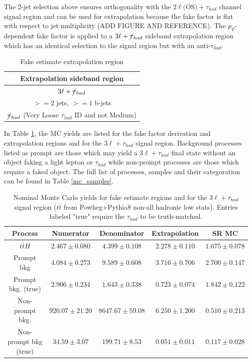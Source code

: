 \documentclass[11pt]{article}
\begin{document}
	The 2-jet selection above ensures orthogonality with the $2\ell \text{(OS)}+\tau_{had}$ channel signal region and can be used for extrapolation because the fake factor is flat with respect to jet multiplicity (ADD FIGURE AND REFERENCE). The $p_T$-dependent fake factor is applied to a $3\ell+\cancel{\tau}_{had}$ sideband extrapolation region which has an identical selection to the signal region but with an anti-$\tau_{had}$. 

	\begin{table}[htp]
		\caption{Fake estimate extrapolation region} 
		\begin{center}
			\begin{tabular}{|c|}
			\hline
			Extrapolation sideband region	\\
			\hline
			$3\ell+\cancel{\tau}_{had}$ 	\\
			$>=2$ jets, $>=1$ b-jets	\\
			$\cancel{\tau}_{had}$ (Very Loose $\tau_{had}$ ID and not Medium) \\
			\hline
			\end{tabular}
		\end{center}
	\end{table}%

	In Table \ref{yields}, the MC yields are listed for the fake factor derivation and extrapolation regions and for the $3\ell+\tau_{had}$ signal region. Background processes listed as prompt are those which may yield a $3\ell+\tau_{had}$ final state without an object faking a light lepton or $\tau_{had}$ while non-prompt processes are those which require a faked object. The full list of processes, samples and their categoration can be found in Table \ref{mc_samples}. 

	\begin{table}[htp]
		\caption{Nominal Monte Carlo yields for fake estimate regions and for the $3\ell+\tau_{had}$ signal region ($t\bar{t}$ from Powheg+Pythia8 non-all hadronic low stats). Entries labeled "true" require the $\tau_{had}$ to be truth-matched.  }
		\begin{center}
			\begin{tabular}{|c|c|c|c|c|}
			\hline
			Process				& Numerator 			& Denominator 		& Extrapolation 			& SR MC \\
			\hline
			$t\bar{t}H$			& $2.467\pm0.080$	& $4.399\pm0.108$	& $2.278\pm0.110$		& $1.675\pm0.078$\\
			Prompt bkg			& $4.084\pm0.273$	& $9.589\pm0.608$	& $3.716\pm0.706$		& $2.700\pm0.147$\\
			Prompt bkg. (true)		& $2.906\pm0.234$	& $1.643\pm0.338$	& $0.723\pm0.074$		& $1.842\pm0.122$\\
			Non-prompt bkg.		& $920.07\pm21.20$	& $8647.67\pm59.08$	& $6.250\pm1.200$		& $0.510\pm0.213$\\
			Non-prompt bkg (true)	& $34.59\pm3.07$		& $199.71\pm8.53$	& $0.051\pm0.011$		& $0.117\pm0.028$\\
			\hline
			\end{tabular}
		\end{center}
		\label{yields}
	\end{table}%
\end{document}
